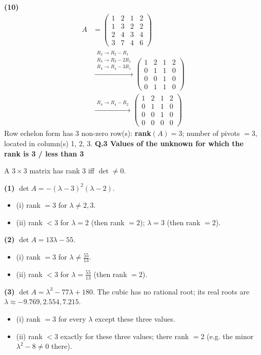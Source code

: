 \noindent\textbf{(10)}
\begin{align*}
A &= \begin{pmatrix}1 & 2 & 1 & 2 \\ 1 & 3 & 2 & 2 \\ 2 & 4 & 3 & 4 \\ 3 & 7 & 4 & 6\end{pmatrix} \\
&\xrightarrow{\substack{R_2\to R_2-R_1\\ R_3\to R_3-2R_1\\ R_4\to R_4-3R_1}} \begin{pmatrix}1 & 2 & 1 & 2 \\ 0 & 1 & 1 & 0 \\ 0 & 0 & 1 & 0 \\ 0 & 1 & 1 & 0\end{pmatrix} \\
&\xrightarrow{\substack{R_4\to R_4-R_2}} \begin{pmatrix}1 & 2 & 1 & 2 \\ 0 & 1 & 1 & 0 \\ 0 & 0 & 1 & 0 \\ 0 & 0 & 0 & 0\end{pmatrix}
\end{align*}
Row echelon form has 3 non-zero row(s): \textbf{rank}$(A)=3$; number of pivots $=3$, located in column(s) 1, 2, 3.
\medskip\noindent\textbf{Q.3  Values of the unknown for which the rank is 3 / less than 3}\par\smallskip
A $3\times3$ matrix has rank $3$ iff $\det\neq 0$.


\noindent\textbf{(1)} $\det A=- \left(\lambda - 3\right)^{2} \left(\lambda - 2\right)$.
\begin{itemize}\item (i) rank $=3$ for $\lambda\neq 2, 3$.
\item (ii) rank $<3$ for $\lambda=2$ (then rank $=2$); $\lambda=3$ (then rank $=2$).\end{itemize}

\noindent\textbf{(2)} $\det A=13 \lambda - 55$.
\begin{itemize}\item (i) rank $=3$ for $\lambda\neq \frac{55}{13}$.
\item (ii) rank $<3$ for $\lambda=\frac{55}{13}$ (then rank $=2$).\end{itemize}

\noindent\textbf{(3)} $\det A=\lambda^{3} - 77 \lambda + 180$.
The cubic has no rational root; its real roots are $\lambda\approx -9.769, 2.554, 7.215$.\begin{itemize}\item (i) rank $=3$ for every $\lambda$ except these three values.\item (ii) rank $<3$ exactly for these three values; there rank $=2$ (e.g. the minor $\lambda^2-8\ne0$ there).\end{itemize}

